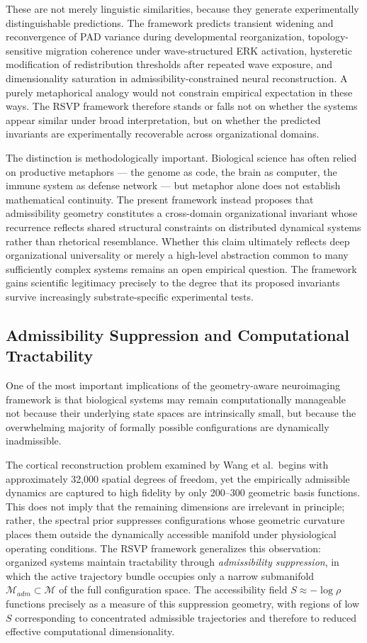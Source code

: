 \documentclass[11pt,a4paper]{article}
\theoremstyle{plain}
\theoremstyle{definition}
\begin{document}
These are not merely linguistic similarities, because they generate experimentally
distinguishable predictions. The framework predicts transient widening and reconvergence
of PAD variance during developmental reorganization, topology-sensitive migration
coherence under wave-structured ERK activation, hysteretic modification of redistribution
thresholds after repeated wave exposure, and dimensionality saturation in
admissibility-constrained neural reconstruction. A purely metaphorical analogy would
not constrain empirical expectation in these ways. The RSVP framework therefore stands
or falls not on whether the systems appear similar under broad interpretation, but on
whether the predicted invariants are experimentally recoverable across organizational
domains.

The distinction is methodologically important. Biological science has often relied on
productive metaphors --- the genome as code, the brain as computer, the immune system
as defense network --- but metaphor alone does not establish mathematical continuity.
The present framework instead proposes that admissibility geometry constitutes a
cross-domain organizational invariant whose recurrence reflects shared structural
constraints on distributed dynamical systems rather than rhetorical resemblance.
Whether this claim ultimately reflects deep organizational universality or merely a
high-level abstraction common to many sufficiently complex systems remains an open
empirical question. The framework gains scientific legitimacy precisely to the degree
that its proposed invariants survive increasingly substrate-specific experimental tests.

\subsection{Admissibility Suppression and Computational Tractability}

One of the most important implications of the geometry-aware neuroimaging framework
is that biological systems may remain computationally manageable not because their
underlying state spaces are intrinsically small, but because the overwhelming majority
of formally possible configurations are dynamically inadmissible.

The cortical reconstruction problem examined by Wang et al.\ begins with approximately
32,000 spatial degrees of freedom, yet the empirically admissible dynamics are captured
to high fidelity by only 200--300 geometric basis functions. This does not imply that
the remaining dimensions are irrelevant in principle; rather, the spectral prior
suppresses configurations whose geometric curvature places them outside the dynamically
accessible manifold under physiological operating conditions. The RSVP framework
generalizes this observation: organized systems maintain tractability through
\emph{admissibility suppression}, in which the active trajectory bundle occupies only
a narrow submanifold $\mathcal{M}_{adm} \subset \mathcal{M}$ of the full configuration
space. The accessibility field $S \approx -\log\rho$ functions precisely as a measure
of this suppression geometry, with regions of low $S$ corresponding to concentrated
admissible trajectories and therefore to reduced effective computational dimensionality.
\end{document}
